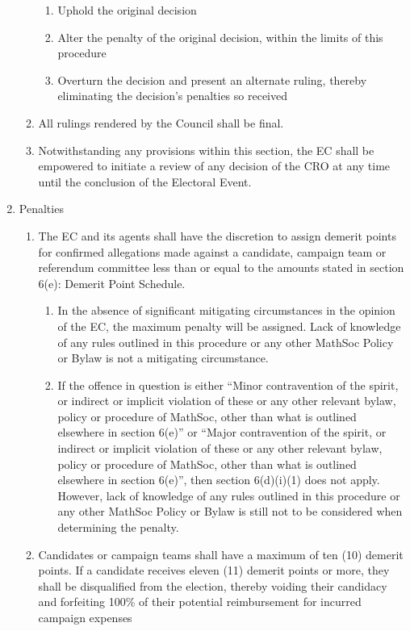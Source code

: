 \begin{enumerate}
\begin{enumerate}
\begin{enumerate}
					\item Uphold the original decision
					\item Alter the penalty of the original decision, within the limits of this procedure
					\item Overturn the decision and present an alternate ruling, thereby eliminating the decision’s penalties so received
				\end{enumerate}
			\item All rulings rendered by the Council shall be final.
			\item Notwithstanding any provisions within this section, the EC shall be empowered to initiate a review of any decision of the CRO at any time until the conclusion of the Electoral Event.
		\end{enumerate}
	\item Penalties
		\begin{enumerate}
			\item The EC and its agents shall have the discretion to assign demerit points for confirmed allegations made against a candidate, campaign team or referendum committee less than or equal to the amounts stated in section 6(e): Demerit Point Schedule. 
				\begin{enumerate}
					\item In the absence of significant mitigating circumstances in the opinion of the EC, the maximum penalty will be assigned. Lack of knowledge of any rules outlined in this procedure or any other MathSoc Policy or Bylaw is not a mitigating circumstance.
					\item If the offence in question is either “Minor contravention of the spirit, or indirect or implicit violation of these or any other relevant bylaw, policy or procedure of MathSoc, other than what is outlined elsewhere in section 6(e)” or “Major contravention of the spirit, or indirect or implicit violation of these or any other relevant bylaw, policy or procedure of MathSoc, other than what is outlined elsewhere in section 6(e)”, then section 6(d)(i)(1) does not apply. However, lack of knowledge of any rules outlined in this procedure or any other MathSoc Policy or Bylaw is still not to be considered when determining the penalty.
				\end{enumerate}
			\item Candidates or campaign teams shall have a maximum of ten (10) demerit points. If a candidate receives eleven (11) demerit points or more, they shall be disqualified from the election, thereby voiding their candidacy and forfeiting 100\% of their potential reimbursement for incurred campaign expenses

\end{enumerate}
\end{enumerate}
